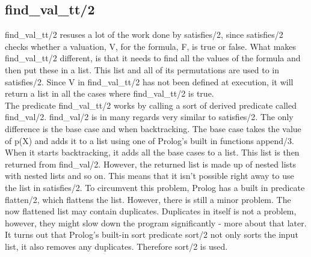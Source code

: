 \documentclass[a4paper,10pt]{article}
\begin{document}
\subsection{find\_val\_tt/2}
\textsf{find\_val\_tt/2} resuses a lot of the work done by \textsf{satisfies/2}, since  \textsf{satisfies/2} checks whether a valuation, V, for the formula, F, is true or false. What makes \textsf{find\_val\_tt/2} different, is that it needs to find all the values of the formula and then put these in a list. This list and all of its permutations are used to in \textsf{satisfies/2}. Since V in \textsf{find\_val\_tt/2} has not been defined at execution, it will return a list in all the cases where \textsf{find\_val\_tt/2} is true.\\
The predicate \textsf{find\_val\_tt/2} works by calling a sort of derived predicate called \textsf{find\_val/2}. \textsf{find\_val/2} is in many regards very similar to \textsf{satisfies/2}. The only difference is the base case and when backtracking. The base case takes the value of \textsf{p(X)} and adds it to a list using one of Prolog's built in functions \textsf{append/3}. When it starts backtracking, it adds all the base cases to a list. This list is then returned from \textsf{find\_val/2}. However, the returned list is made up of nested lists with nested lists and so on. This means that it isn't possible right away to use the list in \textsf{satisfies/2}. To circumvent this problem, Prolog has a built in predicate \textsf{flatten/2}, which flattens the list. However, there is still a minor problem. The now flattened list may contain duplicates. Duplicates in itself is not a problem, however, they might slow down the program significantly - more about that later. It turns out that Prolog's built-in sort predicate \textsf{sort/2} not only sorts the input list, it also removes any duplicates. Therefore \textsf{sort/2} is used.\\
\end{document}
